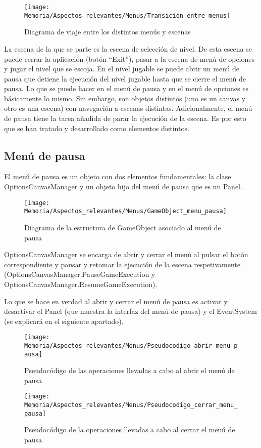 \begin{figure}[h]
\texttt{[image: Memoria/Aspectos\_relevantes/Menus/Transición\_entre\_menus]}
\caption{Diagrama de viaje entre los distintos menús y escenas}
\end{figure}

La escena de la que se parte es la escena de selección de nivel. De esta escena se puede cerrar la aplicación (botón “Exit”), pasar a la escena de menú de opciones y jugar el nivel que se escoja.
En el nivel jugable se puede abrir un menú de pausa que detiene la ejecución del nivel jugable hasta que se cierre el menú de pausa.
Lo que se puede hacer en el menú de pausa y en el menú de opciones es básicamente lo mismo. Sin embargo, son objetos distintos (uno es un canvas y otro es una escena) con navegación a escenas distintas. Adicionalmente, el menú de pausa tiene la tarea añadida de parar la ejecución de la escena. Es por esto que se han tratado y desarrollado como elementos distintos.

\subsection{Menú de pausa}
El menú de pausa es un objeto con dos elementos fundamentales: la clase OptionsCanvasManager y un objeto hijo del menú de pausa que es un Panel.

\clearpage
\begin{figure}[h]
\texttt{[image: Memoria/Aspectos\_relevantes/Menus/GameObject\_menu\_pausa]}
\caption{Diagrama de la estructura de GameObject asociado al menú de pausa}
\end{figure}

OptionsCanvasManager se encarga de abrir y cerrar el menú al pulsar el botón correspondiente y pausar y retomar la ejecución de la escena respetivamente (OptionsCanvasManager.PauseGameExecution y OptionsCanvasManager.ResumeGameExecution).

Lo que se hace en verdad al abrir y cerrar el menú de pausa es activar y desactivar el Panel (que muestra la interfaz del menú de pausa) y el EventSystem (se explicará en el siguiente apartado).

\begin{figure}[h]
\texttt{[image: Memoria/Aspectos\_relevantes/Menus/Pseudocodigo\_abrir\_menu\_pausa]}
\caption{Pseudocódigo de las operaciones llevadas a cabo al abrir el menú de pausa}
\end{figure}

\begin{figure}[h]
\texttt{[image: Memoria/Aspectos\_relevantes/Menus/Pseudocodigo\_cerrar\_menu\_pausa]}
\caption{Pseudocódigo de la operaciones llevadas a cabo al cerrar el menú de pausa}
\end{figure}

